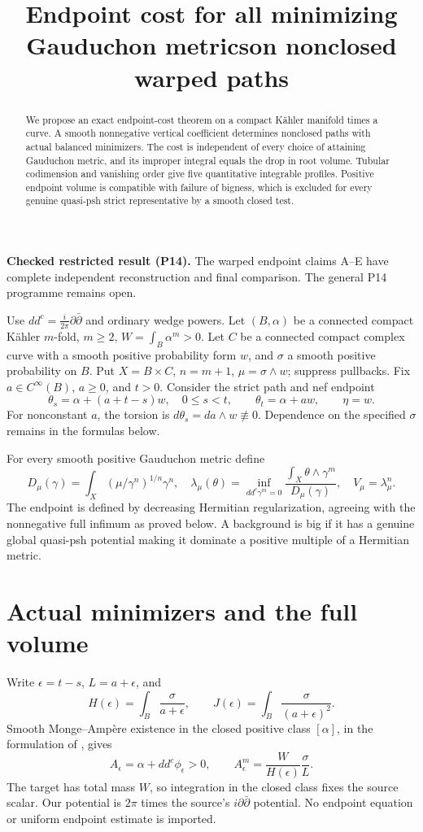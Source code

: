 \documentclass[11pt]{article}
\title{Endpoint cost for all minimizing Gauduchon metrics\newline on nonclosed warped paths}
\author{}\date{}
\newcommand{\ddc}{dd^c}
\theoremstyle{remark}\newtheorem{remark}[theorem]{Remark}
\begin{document}
\maketitle
\noindent\textbf{Checked restricted result (P14).} The warped endpoint
claims A--E have complete independent reconstruction and final comparison.
The general P14 programme remains open.
\begin{abstract}
We propose an exact endpoint-cost theorem on a compact K\"ahler manifold
times a curve. A smooth nonnegative vertical coefficient determines
nonclosed paths with actual balanced minimizers. The cost is independent
of every choice of attaining Gauduchon metric, and its improper integral
equals the drop in root volume. Tubular codimension and vanishing order
give five quantitative integrable profiles. Positive endpoint volume is
compatible with failure of bigness, which is excluded for every genuine
quasi-psh strict representative by a smooth closed test.
\end{abstract}

Use $\ddc=\frac{i}{2\pi}\partial\bar\partial$ and ordinary wedge powers.
Let $(B,\alpha)$ be a connected compact K\"ahler $m$-fold, $m\geq2$,
$W=\int_B\alpha^m>0$. Let $C$ be a connected compact complex curve
with a smooth positive probability form $w$, and $\sigma$ a smooth
positive probability on $B$. Put $X=B\times C$, $n=m+1$,
$\mu=\sigma\wedge w$; suppress pullbacks. Fix $a\in C^\infty(B)$,
$a\geq0$, and $t>0$.
Consider the strict path and nef endpoint
\[
 \theta_s=\alpha+(a+t-s)w,\quad 0\leq s<t,
 \qquad\theta_t=\alpha+aw,\qquad\eta=w.
\]
For nonconstant $a$, the torsion is $d\theta_s=da\wedge w\not\equiv0$.
Dependence on the specified $\sigma$ remains in the formulas below.

For every smooth positive Gauduchon metric define
\[
 D_\mu(\gamma)=\int_X(\mu/\gamma^n)^{1/n}\gamma^n,
 \quad\lambda_\mu(\theta)=
 \inf_{\ddc\gamma^m=0}\frac{\int_X\theta\wedge\gamma^m}{D_\mu(\gamma)},
 \quad V_\mu=\lambda_\mu^n.
\]
The endpoint is defined by decreasing Hermitian regularization, agreeing
with the nonnegative full infimum as proved below. A background is big
if it has a genuine global quasi-psh potential making it dominate a
positive multiple of a Hermitian metric.

\section{Actual minimizers and the full volume}
Write $\epsilon=t-s$, $L=a+\epsilon$, and
\[
 H(\epsilon)=\int_B\frac{\sigma}{a+\epsilon},\qquad
 J(\epsilon)=\int_B\frac{\sigma}{(a+\epsilon)^2}.
\]
Smooth Monge--Amp\`ere existence in the closed positive class
$[\alpha]$, in the formulation of \cite[Corollary 1]{TW}, gives
\[
 A_\epsilon=\alpha+\ddc\phi_\epsilon>0,\qquad
 A_\epsilon^m=\frac{W}{H(\epsilon)}\frac{\sigma}{L}.
\]
The target has total mass $W$, so integration in the closed class fixes
the source scalar. Our potential is $2\pi$ times the source's
$i\partial\bar\partial$ potential. No endpoint equation or uniform
endpoint estimate is imported.
\end{document}
